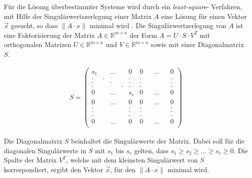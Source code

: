 Für die Lösung überbestimmter Systeme wird durch ein \textit{least-square}- Verfahren, mit Hilfe der Singulärwertszerlegung einer Matrix $A$ eine Lösung für einen Vektor $\vec{x}$ gesucht, so dass $\parallel A \cdot x \parallel$ minimal wird \cite{HZ,Scholz,Schwarz}. Die Singulärwertzerlegung von $A$ ist eine Faktorisierung der Matrix \ensuremath{A \in \mathbb{R}^{m \times n}} der Form \ensuremath{A = U \cdot S \cdot V^T} mit orthogonalen Matrizen \ensuremath{U \in \mathbb{R}^{m \times n}} und \ensuremath{V \in \mathbb{R}^{m \times n}} sowie mit einer Diagonalmatrix $S$. 


\begin{gather}
	S = \begin{pmatrix}
		s_1&&...&&0&0&&...&&0\\
		.&.&&&.&.&&&&.\\
		.&&.&&.&.&&&&.\\
		.&&&.&.&.&&&&.\\
		0&&...&&s_r&0&&...&&0\\	
		0&&...&&0&0&&...&&0\\
		.&&&&.&.&&&&.\\
		.&&&&.&.&&&&.\\	
		.&&&&.&.&&&&.\\	
		0&&...&&0&0&&...&&0\\	
	\end{pmatrix}
\end{gather}

Die  Diagonalmatrix $S$ beinhaltet die Singulärwerte der Matrix. Dabei soll für die diagonalen Singulärwerte in $S$ mit $s_1$ bis $s_r$ gelten, dass \ensuremath{s_1 \geq s_2 \geq ... \geq s_r \ge 0 }\cite{Scholz}. Die Spalte der Matrix $V^T$, welche mit dem kleinsten Singulärwert von $S$ korrespondiert, ergibt den Vektor $\vec{x}$, für den \ensuremath{\parallel A \cdot x\parallel} minimal wird. \\





